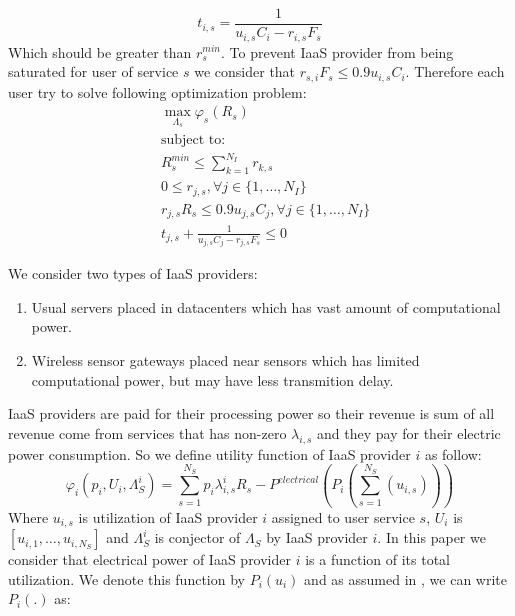 \documentclass[conference]{IEEEtran}
\begin{document}
    \begin{equation}
      t_{i,s} = \frac{1}{u_{i,s} C_i - r_{i,s} F_s}
    \end{equation}
    Which should be greater than $r_s^{min}$.
    To prevent IaaS provider from being saturated for user of service $s$ we consider that $r_{s,i} F_s \le 0.9 u_{i,s} C_i$.
    Therefore each user try to solve following optimization problem:
    \begin{subequations}
      \begin{align}
        &\max_{\Lambda_s} \varphi_s(R_s) \\
        &\text{subject to:} \nonumber \\
        &R_s^{min} \le \sum_{k=1}^{N_I}{r_{k,s}} \\
        &0 \le r_{j,s}, \forall j \in \{1, \hdots,N_I\} \\
        &r_{j,s} R_s \le 0.9 u_{j,s} C_j, \forall j \in \{1, \hdots,N_I\} \\
        &t_{j,s} +  \frac{1}{u_{j,s} C_j - r_{j,s} F_s} \le 0
      \end{align}
    \end{subequations}
    \par
    We consider two types of IaaS providers:
    \begin{enumerate}
      \item Usual servers placed in datacenters which has vast amount of computational power.
      \item Wireless sensor gateways placed near sensors which has limited computational power, but may have less transmition delay.
    \end{enumerate}
    IaaS providers are paid for their processing power so their revenue is sum of all revenue come from services that has non-zero $\lambda_{i,s}$ and they pay for their electric power consumption.
    So we define utility function of IaaS provider $i$ as follow:
    \begin{equation}
      \varphi_i(p_i, U_i, \Lambda_S^i)=\sum_{s=1}^{N_S}{p_i \lambda_{i,s}^i R_s} - P^{electrical}(P_i(\sum_{s=1}^{N_S}(u_{i,s})))
    \end{equation}
    Where $u_{i,s}$ is utilization of IaaS provider $i$ assigned to user service $s$, $U_i$ is $[u_{i,1}, \hdots, u_{i,N_S}]$ and $\Lambda_S^i$ is conjector of $\Lambda_S$ by IaaS provider $i$.
    In this paper we consider that electrical power of IaaS provider $i$ is a function of its total utilization.
    We denote this function by $P_i(u_i)$ and as assumed in \cite{ref1}, we can write $P_i(.)$ as:
\end{document}
